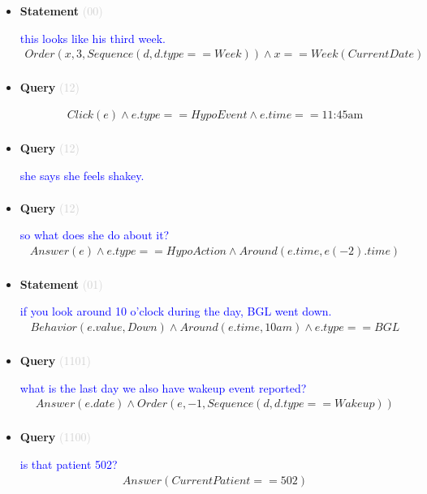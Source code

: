 \documentclass[11pt]{article}
\newcommand{\key}[1]{\textcolor{lightgray}{#1}}
\newcounter{CQuery}
\newcounter{CStatement}
\begin{document}
\begin{itemize}
\item
\textbf{Statement\theCStatement} \key{(00)} \addtocounter{CStatement}{1}
\textcolor{blue}{ this looks like his third week. }
\begin{multline*}
Order(x, 3, Sequence(d, d.type==Week)) \wedge x==Week(CurrentDate) \\ 
\end{multline*}


\item
\textbf{Query\theCQuery} \key{(12)} \addtocounter{CQuery}{1}
\textcolor{blue}{  }
\begin{multline*}
Click(e) \wedge e.type == HypoEvent \wedge e.time == \mbox{11:45am} \\ 
\end{multline*}


\item
\textbf{Query\theCQuery} \key{(12)} \addtocounter{CQuery}{1}
\textcolor{blue}{ she says she feels shakey. }
\begin{multline*}
\end{multline*}


\item
\textbf{Query\theCQuery} \key{(12)} \addtocounter{CQuery}{1}
\textcolor{blue}{ so what does she do about it? }
\begin{multline*}
Answer(e) \wedge e.type == HypoAction \wedge Around(e.time, e(-2).time) \\ 
\end{multline*}


\item
\textbf{Statement\theCStatement} \key{(01)} \addtocounter{CStatement}{1}
\textcolor{blue}{ if you look around 10 o'clock during the day, BGL went down. }
\begin{multline*}
Behavior(e.value, Down) \wedge Around(e.time, 10am) \wedge e.type==BGL \\ 
\end{multline*}


\item
\textbf{Query\theCQuery} \key{(1101)} \addtocounter{CQuery}{1}
\textcolor{blue}{ what is the last day we also have wakeup event reported? }
\begin{multline*}
Answer(e.date) \wedge Order(e, -1, Sequence(d, d.type==Wakeup)) \\ 
\end{multline*}


\item
\textbf{Query\theCQuery} \key{(1100)} \addtocounter{CQuery}{1}
\textcolor{blue}{ is that patient 502? }
\begin{multline*}
Answer(CurrentPatient==502) \\ 
\end{multline*}



\end{itemize}
\end{document}
